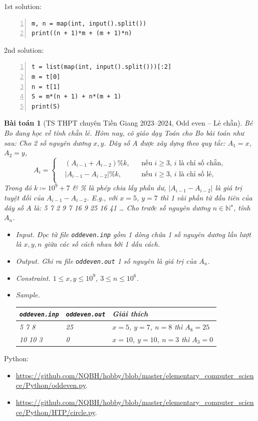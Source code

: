 \documentclass{article}
\newtheorem{baitoan}{Bài toán}
\begin{document}
\begin{multicols}{2}
1st solution:
\begin{Verbatim}[numbers=left,xleftmargin=5mm]
m, n = map(int, input().split())
print((n + 1)*m + (m + 1)*n)
\end{Verbatim}
\columnbreak
2nd solution:
\begin{Verbatim}[numbers=left,xleftmargin=5mm]
t = list(map(int, input().split()))[:2]
m = t[0]
n = t[1]
S = m*(n + 1) + n*(m + 1)
print(S)
\end{Verbatim}
\end{multicols}

\begin{baitoan}[TS THPT chuyên Tiền Giang 2023--2024, Odd even -- Lẻ chẵn]
	Bé Bo đang học về tính chẵn lẻ. Hôm nay, cô giáo dạy Toán cho Bo bài toán như sau: Cho 2 số nguyên dương $x,y$. Dãy số $A$ được xây dựng theo quy tắc: $A_1 = x$, $A_2 = y$,
	\begin{equation*}
		A_i = \left\{\begin{split}
			&(A_{i-1} + A_{i-2})\%k,&&\mbox{nếu } i\ge3,\,i\mbox{ là chỉ số chẵn},\\
			&|A_{i-1} - A_{i-2}|\%k,&&\mbox{nếu } i\ge3,\,i\mbox{ là chỉ số lẻ},\\
		\end{split}\right.
	\end{equation*}
	Trong đó $k\coloneqq10^9 + 7$ \& \% là phép chia lấy phần dư, $|A_{i-1} - A_{i-2}|$ là giá trị tuyệt đối của $A_{i-1} - A_{i-2}$. E.g., với $x = 5$, $y = 7$ thì 1 vài phần tử đầu tiên của dãy số $A$ là: \emph{5 7 2 9 7 16 9 25 16 41 \ldots} Cho trước số nguyên dương $n\in\mathbb{N}^\star$, tính $A_n$.
	\begin{itemize}
		\item {\sf Input.} Đọc từ file \verb|oddeven.inp| gồm 1 dòng chứa 1 số nguyên dương lần lượt là $x,y,n$ giữa các số cách nhau bởi 1 dấu cách.
		\item {\sf Output.} Ghi ra file \verb|oddeven.out| 1 số nguyên là giá trị của $A_n$.
		\item {\sf Constraint.} $1\le x,y\le10^9$, $3\le n\le10^6$.
		\item {\sf Sample.}
		\begin{table}[H]
			\centering
			\begin{tabular}{|l|l|l|}
				\hline
				{\tt oddeven.inp} & {\tt oddeven.out} & Giải thích \\
				\hline
				5 7 8 & 25 & $x = 5$, $y = 7$, $n = 8$ thì $A_8 = 25$ \\
				\hline
				10 10 3 & 0 & $x = 10$, $y = 10$, $n = 3$ thì $A_3 = 0$ \\
				\hline
			\end{tabular}
		\end{table}
	\end{itemize}
\end{baitoan}
Python:
\begin{itemize}
	\item \url{https://github.com/NQBH/hobby/blob/master/elementary_computer_science/Python/oddeven.py}.
	\item \url{https://github.com/NQBH/hobby/blob/master/elementary_computer_science/Python/HTP/circle.py}.
\end{itemize}
\end{document}
